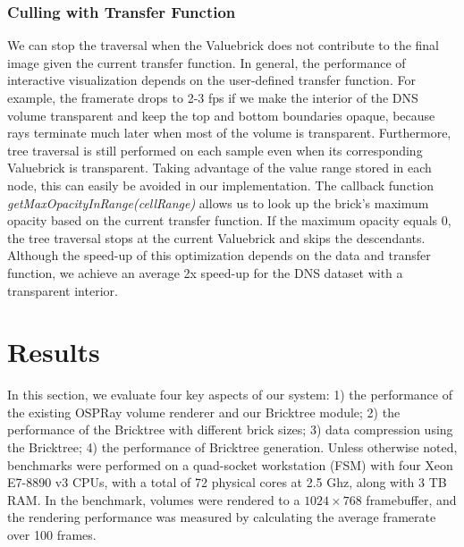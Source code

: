 \subsubsection{Culling with Transfer Function}
We can stop the traversal when the Valuebrick does not contribute to the 
final image given the current transfer function. In general, the performance of interactive visualization
depends on the user-defined transfer function.
For example, the framerate drops to 2-3 fps if we make the interior of the DNS volume transparent and keep the
top and bottom boundaries opaque, because rays terminate much later
when most of the volume is transparent. Furthermore, tree traversal is still performed on each
sample even when its corresponding Valuebrick is transparent. Taking advantage of the value
range stored in each node, this can easily be avoided in our implementation. The callback
function \textit{getMaxOpacityInRange(cellRange)} allows us to look up the brick's maximum
opacity based on the current transfer function.
If the maximum opacity equals 0, the tree traversal stops at the 
current Valuebrick and skips the descendants. Although the speed-up of this optimization
depends on the data and transfer function, we achieve an average 2x speed-up for
the DNS dataset with a transparent interior.



\section{Results}
In this section, we evaluate four key aspects of our system: 1) the performance of the existing OSPRay
volume renderer and our Bricktree module; 2) the performance of the Bricktree with different brick sizes;
3) data compression using the Bricktree; 4) the performance of Bricktree generation. Unless otherwise noted,
benchmarks were performed on a quad-socket workstation (FSM) with four Xeon E7-8890 v3 CPUs, with a total
of 72 physical cores at 2.5 Ghz, along with 3 TB RAM.
In the benchmark, volumes were rendered to a
$1024 \times 768$ framebuffer, and the rendering performance was measured by calculating the average framerate over 100 frames. 

